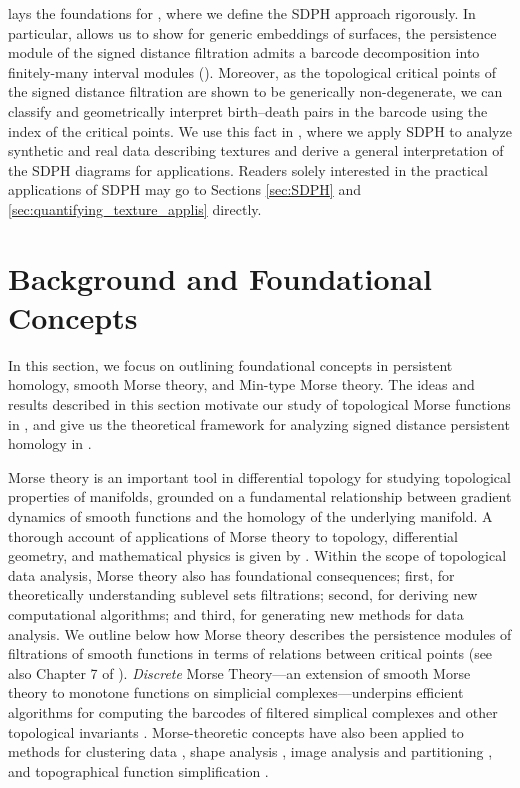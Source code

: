 \documentclass[11pt]{article}
\theoremstyle{plain}
\theoremstyle{definition}
\theoremstyle{remark}
\begin{document}
	
	 lays the foundations for , where we define the SDPH approach rigorously. In particular,  allows us to show for generic embeddings of surfaces, the persistence module of the signed distance filtration admits a barcode decomposition into finitely-many interval modules (). Moreover, as the topological critical points of the signed distance filtration are shown to be generically non-degenerate, we can classify and geometrically interpret birth--death pairs in the barcode using the index of the critical points. We use this fact in , where we apply SDPH to analyze synthetic and real data describing textures and derive a general interpretation of the SDPH diagrams for applications.
	Readers solely interested in the practical applications of SDPH may go to Sections \ref{sec:SDPH} and \ref{sec:quantifying_texture_applis} directly.
	
	
	\section{Background and Foundational Concepts}
	\label{sec:background}
	
	In this section, we focus on outlining foundational concepts in persistent homology, smooth Morse theory, and Min-type Morse theory. The ideas and results described in this section motivate our study of topological Morse functions in , and give us the theoretical framework for analyzing signed distance persistent homology in . 
	
	Morse theory \citep{milnor_morse_1963} is an important tool in differential topology for studying topological properties of manifolds, grounded on a fundamental relationship between  gradient dynamics of smooth functions and the homology of the underlying manifold. 
	A thorough account of applications of Morse theory to topology, differential geometry, and mathematical physics is given by \cite{bott1988morse}. Within the scope of topological data analysis, Morse theory also has foundational consequences; first, for theoretically understanding sublevel sets filtrations; second, for deriving new computational algorithms; and third, for generating new methods for data analysis. We outline below how Morse theory describes the persistence modules of filtrations of smooth functions in terms of relations between critical points (see also Chapter 7 of \cite{ghrist2014elementary}). \emph{Discrete} Morse Theory---an extension of smooth Morse theory to monotone functions on simplicial complexes---underpins efficient algorithms for computing the barcodes of filtered simplical complexes \citep{harker2014discrete} and other topological invariants \citep{curry2016discrete}. Morse-theoretic concepts have also been applied to methods for clustering data \citep{chazal2013persistence}, shape analysis \citep{cazals2003molecular}, image analysis and partitioning \citep{edelsbrunner2001hierarchical}, and topographical function simplification \citep{bauer2012optimal,tierny2012generalized}.
	
\end{document}

